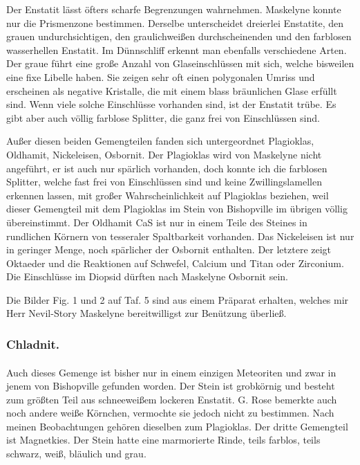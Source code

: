 \documentclass[a4paper, 11pt, oneside, polutonikogreek, german]{article}
\begin{document}
Der Enstatit lässt öfters scharfe Begrenzungen wahrnehmen. Maskelyne konnte nur die Prismenzone bestimmen. Derselbe unterscheidet dreierlei Enstatite, den grauen undurchsichtigen, den graulichweißen durchscheinenden und den farblosen wasserhellen Enstatit. Im Dünnschliff erkennt man ebenfalls verschiedene Arten. Der graue führt eine große Anzahl von Glaseinschlüssen mit sich, welche bisweilen eine fixe Libelle haben. Sie zeigen sehr oft einen polygonalen Umriss und erscheinen als negative Kristalle, die mit einem blass bräunlichen Glase erfüllt sind. Wenn viele solche Einschlüsse vorhanden sind, ist der Enstatit trübe. Es gibt aber auch völlig farblose Splitter, die ganz frei von Einschlüssen sind.

Außer diesen beiden Gemengteilen fanden sich untergeordnet Plagioklas, Oldhamit, Nickeleisen, Osbornit. Der Plagioklas wird von Maskelyne nicht angeführt, er ist auch nur spärlich vorhanden, doch konnte ich die farblosen Splitter, welche fast frei von Einschlüssen sind und keine Zwillingslamellen erkennen lassen, mit großer Wahrscheinlichkeit auf Plagioklas beziehen, weil dieser Gemengteil mit dem Plagioklas im Stein von Bishopville im übrigen völlig übereinstimmt. Der Oldhamit CaS ist nur in einem Teile des Steines in rundlichen Körnern von tesseraler Spaltbarkeit vorhanden. Das Nickeleisen ist nur in geringer Menge, noch spärlicher der Osbornit enthalten. Der letztere zeigt Oktaeder und die Reaktionen auf Schwefel, Calcium und Titan oder Zirconium. Die Einschlüsse im Diopsid dürften nach Maskelyne Osbornit sein.

Die Bilder Fig. 1 und 2 auf Taf. 5 sind aus einem Präparat erhalten, welches mir Herr Nevil-Story Maskelyne bereitwilligst zur Benützung überließ.

\subsubsection{Chladnit.}
\paragraph{}
Auch dieses Gemenge ist bisher nur in einem einzigen Meteoriten und zwar in jenem von Bishopville gefunden worden. Der Stein ist grobkörnig und besteht zum größten Teil aus schneeweißem lockeren Enstatit. G. Rose bemerkte auch noch andere weiße Körnchen, vermochte sie jedoch nicht zu bestimmen. Nach meinen Beobachtungen gehören dieselben zum Plagioklas. Der dritte Gemengteil ist Magnetkies. Der Stein hatte eine marmorierte Rinde, teils farblos, teils schwarz, weiß, bläulich und grau.
\end{document}
